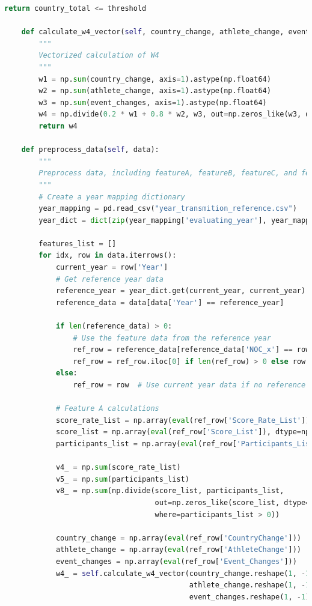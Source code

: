 \documentclass[12pt]{article}
\begin{document}
\begin{lstlisting}[language=Python, style=mystyle, caption=model.ipynb]
        return country_total <= threshold

    def calculate_w4_vector(self, country_change, athlete_change, event_changes):
        """
        Vectorized calculation of W4
        """
        w1 = np.sum(country_change, axis=1).astype(np.float64)
        w2 = np.sum(athlete_change, axis=1).astype(np.float64)
        w3 = np.sum(event_changes, axis=1).astype(np.float64)
        w4 = np.divide(0.2 * w1 + 0.8 * w2, w3, out=np.zeros_like(w3, dtype=np.float64), where=w3 != 0)
        return w4

    def preprocess_data(self, data):
        """
        Preprocess data, including featureA, featureB, featureC, and feature_all using reference years
        """
        # Create a year mapping dictionary
        year_mapping = pd.read_csv("year_transmition_reference.csv")
        year_dict = dict(zip(year_mapping['evaluating_year'], year_mapping['use_data_from']))
        
        features_list = []
        for idx, row in data.iterrows():
            current_year = row['Year']
            # Get reference year data
            reference_year = year_dict.get(current_year, current_year)
            reference_data = data[data['Year'] == reference_year]
            
            if len(reference_data) > 0:
                # Use the feature data from the reference year
                ref_row = reference_data[reference_data['NOC_x'] == row['NOC_x']]
                ref_row = ref_row.iloc[0] if len(ref_row) > 0 else row
            else:
                ref_row = row  # Use current year data if no reference found

            # Feature A calculations
            score_rate_list = np.array(eval(ref_row['Score_Rate_List']))
            score_list = np.array(eval(ref_row['Score_List']), dtype=np.float64)
            participants_list = np.array(eval(ref_row['Participants_List']), dtype=np.float64)

            v4_ = np.sum(score_rate_list)
            v5_ = np.sum(participants_list)
            v8_ = np.sum(np.divide(score_list, participants_list, 
                                   out=np.zeros_like(score_list, dtype=np.float64), 
                                   where=participants_list > 0))

            country_change = np.array(eval(ref_row['CountryChange']))
            athlete_change = np.array(eval(ref_row['AthleteChange']))
            event_changes = np.array(eval(ref_row['Event_Changes']))
            w4_ = self.calculate_w4_vector(country_change.reshape(1, -1), 
                                           athlete_change.reshape(1, -1), 
                                           event_changes.reshape(1, -1))[0]


\end{lstlisting}
\end{document}
